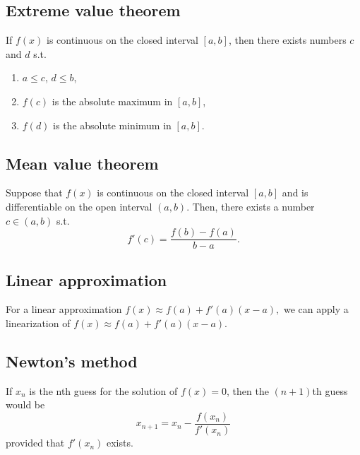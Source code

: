 \documentclass[main.tex]{subfiles}
\begin{document}
\begin{multicols}{2}
	\subsection*{Extreme value theorem}
	\begin{theorem}
	If \(f(x)\) is continuous on the closed interval \([a, b]\), then there exists numbers \(c\) and \(d\) s.t.
	\begin{enumerate}
		\item \(a \leq c\), \(d \leq b\),
		\item \(f(c)\) is the absolute maximum in \([a, b]\),
		\item \(f(d)\) is the absolute minimum in \([a, b]\).
	\end{enumerate}
	\end{theorem}

	\subsection*{Mean value theorem}
	\begin{theorem}
	Suppose that \(f(x)\) is continuous on the closed interval \([a, b]\) and is differentiable on the open interval \((a, b)\). Then, there exists a number \(c \in (a, b)\) s.t. \[f'(c) = \frac{f(b) - f(a)}{b - a}.\]
	\end{theorem}

	\subsection*{Linear approximation}
	For a linear approximation \(f(x) \approx f(a) + f'(a)(x - a),\) we can apply a linearization of \(f(x) \approx f(a) + f'(a)(x - a).\)

	\subsection*{Newton's method}
	\begin{definition}
	If \(x_n\) is the nth guess for the solution of \(f(x) = 0\), then the \((n + 1)\)th guess would be \[x_{n+1} = x_n - \frac{f(x_n)}{f'(x_n)}\] provided that \(f'(x_n)\) exists.
	\end{definition}
\end{multicols}
\end{document}

